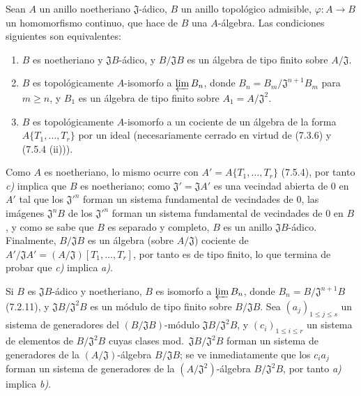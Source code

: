 \begin{proposition}[7.5.5]
\label{0.7.5.5-fr}
Sean $A$ un anillo noetheriano $\mathfrak J$-ádico, $B$ un anillo topológico
admisible, $\varphi:A\to B$ un homomorfismo continuo, que hace de $B$ una
$A$-álgebra. Las condiciones siguientes son equivalentes:
\begin{enumerate}
  \item[a)] $B$ es noetheriano y $\mathfrak JB$-ádico, y
  $B/\mathfrak JB$ es un álgebra de tipo finito sobre $A/\mathfrak J$.

  \item[b)] $B$ es topológicamente $A$-isomorfo a $\varprojlim B_n$, donde
  $B_n=B_m/\mathfrak J^{n+1}B_m$ para $m\geq n$, y $B_1$ es un álgebra de
  tipo finito sobre $A_1=A/\mathfrak J^2$.

  \item[c)] $B$ es topológicamente $A$-isomorfo a un cociente de un álgebra
  de la forma\linebreak $A\{T_1,\ldots,T_r\}$ por un ideal (necesariamente cerrado en virtud
  de \textup{(7.3.6)} y \textup{(7.5.4 (ii))}).
\end{enumerate}
\end{proposition}

Como $A$ es noetheriano, lo mismo ocurre con
$A'=A\{T_1,\ldots,T_r\}$ (7.5.4), por tanto \emph{c)} implica que $B$ es noetheriano;
como $\mathfrak J'=\mathfrak JA'$ es una vecindad abierta de 0 en $A'$ tal
que los $\mathfrak J'^{n}$ forman un sistema fundamental de vecindades de 0,
las imágenes $\mathfrak J^nB$ de los $\mathfrak J'^{n}$ forman un sistema
fundamental de vecindades de 0 en $B$, y como se sabe que $B$ es separado y
completo, $B$ es un anillo $\mathfrak JB$-ádico. Finalmente, $B/\mathfrak JB$ es
un álgebra (sobre $A/\mathfrak J$) cociente de
$A'/\mathfrak JA'=(A/\mathfrak J)[T_1,\ldots,T_r]$, por tanto es de tipo finito, lo
que termina de probar que \emph{c)} implica \emph{a)}.

Si $B$ es $\mathfrak JB$-ádico y noetheriano, $B$ es isomorfo a
$\varprojlim B_n$, donde $B_n=B/\mathfrak J^{n+1}B$ (7.2.11), y
$\mathfrak JB/\mathfrak J^2B$ es un módulo de tipo finito sobre
$B/\mathfrak JB$. Sea $(a_j)_{1\leq j\leq s}$ un sistema de generadores del
$(B/\mathfrak JB)$-módulo $\mathfrak JB/\mathfrak J^2B$, y
$(c_i)_{1\leq i\leq r}$ un sistema de elementos de $B/\mathfrak J^2B$ cuyas
clases
mod.~$\mathfrak JB/\mathfrak J^2B$ forman un sistema de generadores de la
$(A/\mathfrak J)$-álgebra $B/\mathfrak JB$; se ve inmediatamente que los $c_ia_j$
forman un sistema de generadores de la $(A/\mathfrak J^2)$-álgebra
$B/\mathfrak J^2B$, por tanto \emph{a)} implica \emph{b)}.

